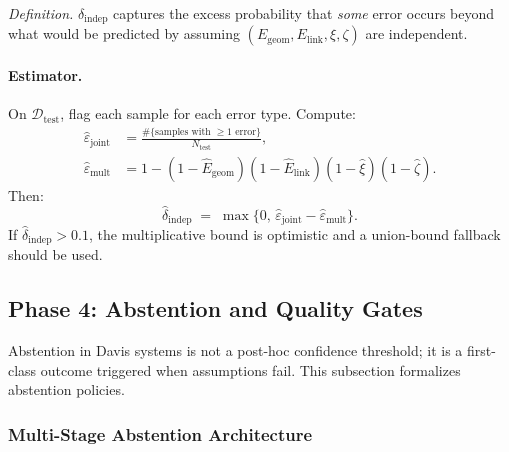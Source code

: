 \documentclass[11pt]{article}
\theoremstyle{remark}
\theoremstyle{plain}
\begin{document}
\emph{Definition.} $\delta_{\mathrm{indep}}$ captures the excess probability that \emph{some} error occurs beyond what would be predicted by assuming $(E_{\mathrm{geom}}, E_{\mathrm{link}}, \xi, \zeta)$ are independent.

\paragraph{Estimator.}
On $\mathcal{D}_{\mathrm{test}}$, flag each sample for each error type. Compute:
\begin{align*}
\hat\varepsilon_{\text{joint}}
&= \frac{\#\{\text{samples with } \ge 1 \text{ error}\}}{N_{\mathrm{test}}}, \\
\hat\varepsilon_{\text{mult}}
&= 1 - (1-\hat E_{\mathrm{geom}})(1-\hat E_{\mathrm{link}})(1-\hat\xi)(1-\hat\zeta).
\end{align*}
Then:
\[
\hat\delta_{\mathrm{indep}}
\;=\;
\max\bigl\{0,\, \hat\varepsilon_{\text{joint}} - \hat\varepsilon_{\text{mult}}\bigr\}.
\]
If $\hat\delta_{\mathrm{indep}} > 0.1$, the multiplicative bound is optimistic and a union-bound fallback should be used.

\subsection{Phase 4: Abstention and Quality Gates}
\label{subsec:abstention-gates}

Abstention in Davis systems is not a post-hoc confidence threshold; it is a first-class outcome triggered when assumptions fail. This subsection formalizes abstention policies.

\subsubsection{Multi-Stage Abstention Architecture}
\end{document}
